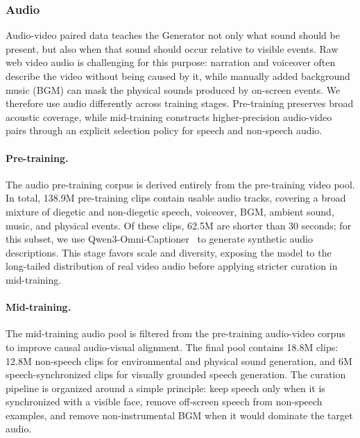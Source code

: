 \subsubsection{Audio}
\label{subsubsec::data_gen_audio}

Audio-video paired data teaches the Generator not only what sound should be present, but also when that sound should occur relative to visible events. Raw web video audio is challenging for this purpose: narration and voiceover often describe the video without being caused by it, while manually added background music (BGM) can mask the physical sounds produced by on-screen events. We therefore use audio differently across training stages. Pre-training preserves broad acoustic coverage, while mid-training constructs higher-precision audio-video pairs through an explicit selection policy for speech and non-speech audio.

\paragraph{Pre-training.}
The audio pre-training corpus is derived entirely from the pre-training video pool. In total, 138.9M pre-training clips contain usable audio tracks, covering a broad mixture of diegetic and non-diegetic speech, voiceover, BGM, ambient sound, music, and physical events. Of these clips, 62.5M are shorter than 30 seconds; for this subset, we use Qwen3-Omni-Captioner~\citep{xu2025qwen3omni} to generate synthetic audio descriptions. This stage favors scale and diversity, exposing the model to the long-tailed distribution of real video audio before applying stricter curation in mid-training.

\paragraph{Mid-training.}
The mid-training audio pool is filtered from the pre-training audio-video corpus to improve causal audio-visual alignment. The final pool contains 18.8M clips: 12.8M non-speech clips for environmental and physical sound generation, and 6M speech-synchronized clips for visually grounded speech generation. The curation pipeline is organized around a simple principle: keep speech only when it is synchronized with a visible face, remove off-screen speech from non-speech examples, and remove non-instrumental BGM when it would dominate the target audio.

